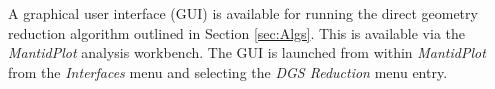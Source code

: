A graphical user interface (GUI) is available for running the direct geometry reduction algorithm outlined in Section \ref{sec:Algs}. This is available via the \textit{MantidPlot} analysis workbench. The GUI is launched from within \textit{MantidPlot} from the \textit{Interfaces} menu and selecting the \textit{DGS Reduction} menu entry. 
